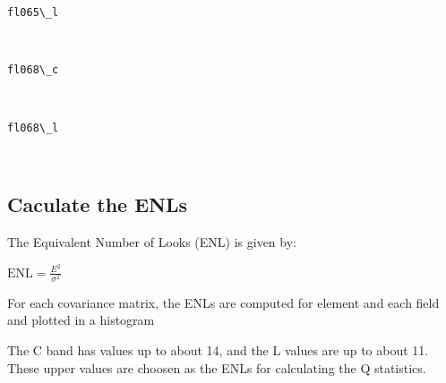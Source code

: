 \documentclass[11pt]{article}
\begin{document}
    \begin{Verbatim}[commandchars=\\\{\}]
fl065\_l

    \end{Verbatim}

    \begin{center}
    \end{center}
    { \hspace*{\fill} \\}
    
    \begin{Verbatim}[commandchars=\\\{\}]
fl068\_c

    \end{Verbatim}

    \begin{center}
    \end{center}
    { \hspace*{\fill} \\}
    
    \begin{Verbatim}[commandchars=\\\{\}]
fl068\_l

    \end{Verbatim}

    \begin{center}
    \end{center}
    { \hspace*{\fill} \\}
    
    \hypertarget{caculate-the-enls}{%
\subsection{Caculate the ENLs}\label{caculate-the-enls}}

The Equivalent Number of Looks (ENL) is given by:

\(\text{ENL} = \frac{E^2}{\sigma^2}\)

For each covariance matrix, the ENLs are computed for element and each
field and plotted in a histogram

The C band has values up to about 14, and the L values are up to about
11. These upper values are choosen as the ENLs for calculating the Q
statistics.
\end{document}
